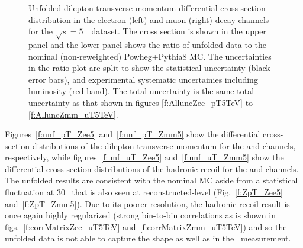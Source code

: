 \begin{figure}[h]
\centering
{}

\caption{Unfolded dilepton transverse momentum differential cross-section distribution in the electron (left) and muon (right) \Zboson decay channels for the $\sqrt{s} = 5$~\TeV\ dataset. The cross section is shown in the upper panel and the lower panel shows the ratio of unfolded data to the nominal (non-reweighted) Powheg+Pythia8 MC. The uncertainties in the ratio plot are split to show the statistical uncertainty (black error bars), and experimental systematic uncertainies including luminosity (red band). The total uncertainty is the same total uncertainty as that shown in figures \ref{f:AlluncZee_pT5TeV} to \ref{f:AlluncZmm_uT5TeV}.}\end{figure}

Figures~\ref{f:unf_pT_Zee5} and~\ref{f:unf_pT_Zmm5} show the differential cross-section distributions of the dilepton transverse momentum for the \Zee and \Zmm channels, respectively, while figures~\ref{f:unf_uT_Zee5} and~\ref{f:unf_uT_Zmm5} show the differential cross-section distributions of the hadronic recoil for the \Zee and \Zmm channels.
The unfolded results are consistent with the nominal MC aside from a statistical fluctuation at 30 \GeV\ that is also seen at reconstructed-level (Fig.~\ref{f:ZpT_Zee5} and~\ref{f:ZpT_Zmm5}). Due to its poorer resolution, the hadronic recoil result is once again highly regularized (strong bin-to-bin correlations as is shown in figs.~\ref{f:corrMatrixZee_uT5TeV} and~\ref{f:corrMatrixZmm_uT5TeV}) and so the unfolded data is not able to capture the shape as well as in the \ptll\ measurement.


